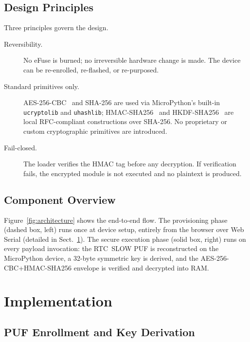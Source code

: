 \documentclass[runningheads]{llncs}
\begin{document}
\subsection{Design Principles}

Three principles govern the design.

\begin{description}
\item[Reversibility.] No eFuse is burned; no irreversible hardware change is made. The device can be re-enrolled, re-flashed, or re-purposed.

\item[Standard primitives only.] AES-256-CBC~\cite{nist2023fips197} and SHA-256 are used via MicroPython's built-in \texttt{ucryptolib} and \texttt{uhashlib}; HMAC-SHA256~\cite{krawczyk1997hmac} and HKDF-SHA256~\cite{krawczyk2010hkdf} are local RFC-compliant constructions over SHA-256. No proprietary or custom cryptographic primitives are introduced.

\item[Fail-closed.] The loader verifies the HMAC tag before any decryption. If verification fails, the encrypted module is not executed and no plaintext is produced.
\end{description}

\subsection{Component Overview}

Figure~\ref{fig:architecture} shows the end-to-end flow. The provisioning phase (dashed box, left) runs once at device setup, entirely from the browser over Web Serial (detailed in Sect.~\ref{sec:implementation}). The secure execution phase (solid box, right) runs on every payload invocation: the RTC~SLOW PUF is reconstructed on the MicroPython device, a 32-byte symmetric key is derived, and the AES-256-CBC+HMAC-SHA256 envelope is verified and decrypted into RAM.

\section{Implementation}
\label{sec:implementation}


\subsection{PUF Enrollment and Key Derivation}
\end{document}
